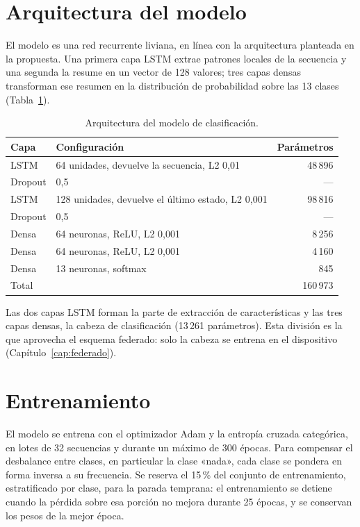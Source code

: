 \section{Arquitectura del modelo}

El modelo es una red recurrente liviana, en línea con la arquitectura planteada en la propuesta. Una primera capa LSTM extrae patrones locales de la secuencia y una segunda la resume en un vector de 128 valores; tres capas densas transforman ese resumen en la distribución de probabilidad sobre las 13 clases (Tabla~\ref{tab:arquitectura}).

\begin{table}[h]
    \centering
    \begin{tabular}{llr}
        \toprule
        Capa & Configuración & Parámetros \\
        \midrule
        LSTM & 64 unidades, devuelve la secuencia, L2 0,01 & 48\,896 \\
        Dropout & 0,5 & --- \\
        LSTM & 128 unidades, devuelve el último estado, L2 0,001 & 98\,816 \\
        Dropout & 0,5 & --- \\
        Densa & 64 neuronas, ReLU, L2 0,001 & 8\,256 \\
        Densa & 64 neuronas, ReLU, L2 0,001 & 4\,160 \\
        Densa & 13 neuronas, softmax & 845 \\
        \midrule
        Total & & 160\,973 \\
        \bottomrule
    \end{tabular}
    \caption{Arquitectura del modelo de clasificación.}
    \label{tab:arquitectura}
\end{table}

Las dos capas LSTM forman la parte de extracción de características y las tres capas densas, la cabeza de clasificación (13\,261 parámetros). Esta división es la que aprovecha el esquema federado: solo la cabeza se entrena en el dispositivo (Capítulo~\ref{cap:federado}).

\section{Entrenamiento}

El modelo se entrena con el optimizador Adam y la entropía cruzada categórica, en lotes de 32 secuencias y durante un máximo de 300 épocas. Para compensar el desbalance entre clases, en particular la clase «nada», cada clase se pondera en forma inversa a su frecuencia. Se reserva el 15\,\% del conjunto de entrenamiento, estratificado por clase, para la parada temprana: el entrenamiento se detiene cuando la pérdida sobre esa porción no mejora durante 25 épocas, y se conservan los pesos de la mejor época.

